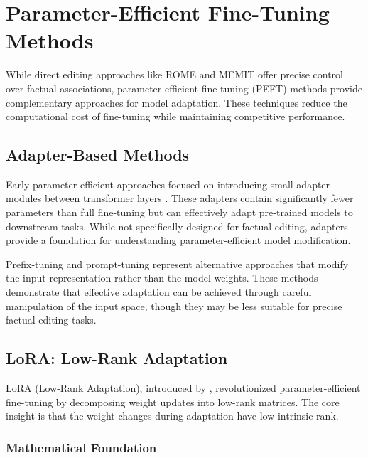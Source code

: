 
\section{Parameter-Efficient Fine-Tuning Methods}

While direct editing approaches like ROME and MEMIT offer precise control over factual associations, parameter-efficient fine-tuning (PEFT) methods provide complementary approaches for model adaptation. These techniques reduce the computational cost of fine-tuning while maintaining competitive performance.

\subsection{Adapter-Based Methods}

Early parameter-efficient approaches focused on introducing small adapter modules between transformer layers \cite{houlsby_2019_adapters}. These adapters contain significantly fewer parameters than full fine-tuning but can effectively adapt pre-trained models to downstream tasks. While not specifically designed for factual editing, adapters provide a foundation for understanding parameter-efficient model modification.

Prefix-tuning \cite{li_2021_prefix_tuning} and prompt-tuning \cite{lester_2021_prompt_tuning} represent alternative approaches that modify the input representation rather than the model weights. These methods demonstrate that effective adaptation can be achieved through careful manipulation of the input space, though they may be less suitable for precise factual editing tasks.

\subsection{LoRA: Low-Rank Adaptation}

LoRA (Low-Rank Adaptation), introduced by \cite{hu_2022_lora}, revolutionized parameter-efficient fine-tuning by decomposing weight updates into low-rank matrices. The core insight is that the weight changes during adaptation have low intrinsic rank.

\subsubsection{Mathematical Foundation}


